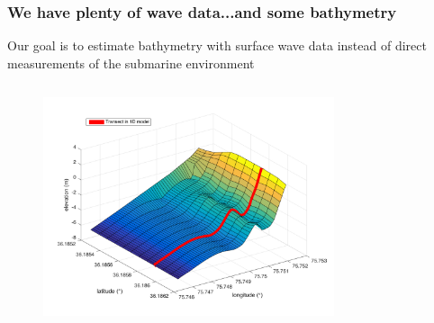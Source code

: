 \documentclass[7pt]{beamer}
\begin{document}

\begin{frame}
 \frametitle{We have plenty of wave data...and some bathymetry}
Our goal is to estimate bathymetry with surface wave data instead of direct measurements of the submarine environment
\begin{columns}
\begin{figure}[H]
	 	\includegraphics[width=1.2\linewidth]{img/trueBath2D.png}
	 	\end{figure}
\begin{figure}[h]

\end{figure}
\end{columns}
\end{frame}
\end{document}
